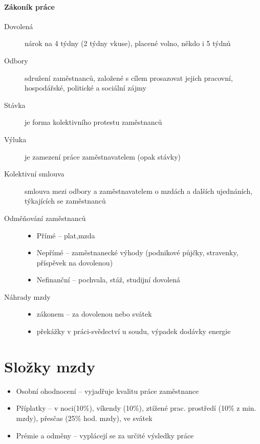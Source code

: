 \paragraph*{Zákoník práce}
\begin{description}
    \item[Dovolená] nárok na 4 týdny (2 týdny vkuse), placené volno, někdo i 5 týdnů
    \item[Odbory] sdružení zaměstnanců, založené s cílem prosazovat jejich pracovní, hospodářské, politické a sociální zájmy
    \item[Stávka] je forma kolektivního protestu zaměstnanců
    \item[Výluka] je zamezení práce zaměstnavatelem (opak stávky)
    \item[Kolektivní smlouva] smlouva mezi odbory a zaměstnavatelem o mzdách a dalších ujednáních, týkajících se zaměstnanců
    \item[Odměňování zaměstnanců]
        \begin{itemize}
            \item Přímé -- plat,mzda
            \item Nepřímé -- zaměstnanecké výhody (podnikové půjčky, stravenky, příspěvek na dovolenou)
            \item Nefinanční -- pochvala, stáž, studijní dovolená				
        \end{itemize}
    \item[Náhrady mzdy]
        \begin{itemize}
            \item zákonem -- za dovolenou nebo svátek
            \item překážky v práci-svědectví u soudu, výpadek dodávky energie
        \end{itemize}
\end{description}

\section*{Složky mzdy}
\begin{itemize}			
    \item Osobní ohodnocení -- vyjadřuje kvalitu práce zaměstnance
    \item Příplatky -- v noci(10\%), víkendy (10\%), ztížené prac. prostředí (10\% z min. mzdy), přesčas (25\% hod. mzdy), ve svátek
    \item Prémie a odměny -- vyplácejí se za určité výsledky práce
\end{itemize}


